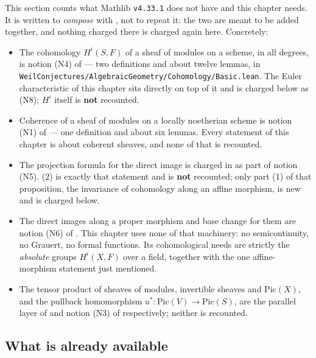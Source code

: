 This section counts what Mathlib \texttt{v4.33.1} does not have and this
chapter needs.  It is written to \emph{compose} with , not
to repeat it: the two are meant to be added together, and nothing charged
there is charged again here.  Concretely:

\begin{itemize}
  \item The cohomology $H^i(S,F)$ of a sheaf of modules on a scheme, in all
  degrees, is notion (N4) of  --- two definitions and about
  twelve lemmas, in
  \texttt{WeilConjectures/AlgebraicGeometry/Cohomology/Basic.lean}.  The Euler
  characteristic of this chapter sits directly on top of it and is charged
  below as (N8); $H^i$ itself is \textbf{not} recounted.
  \item Coherence of a sheaf of modules on a locally noetherian scheme is
  notion (N1) of  --- one definition and about six lemmas.
  Every statement of this chapter is about coherent sheaves, and none of that
  is recounted.
  \item The projection formula for the direct image is charged in
   as part of notion (N5).
  (2) is exactly that statement and is
  \textbf{not} recounted; only part (1) of that proposition, the invariance of
  cohomology along an affine morphism, is new and is charged below.
  \item The direct images along a proper morphism and base change for them are
  notion (N6) of .  This chapter uses none of that
  machinery: no semicontinuity, no Grauert, no formal functions.  Its
  cohomological needs are strictly the \emph{absolute} groups $H^i(X,F)$ over a
  field, together with the one affine-morphism statement just mentioned.
  \item The tensor product of sheaves of modules, invertible sheaves and
  $\mathrm{Pic}(X)$, and the pullback homomorphism
  $u^*\colon\mathrm{Pic}(V)\to\mathrm{Pic}(S)$, are the parallel layer of
   and notion (N3) of 
  respectively; neither is recounted.
\end{itemize}

\subsection*{What is already available}

